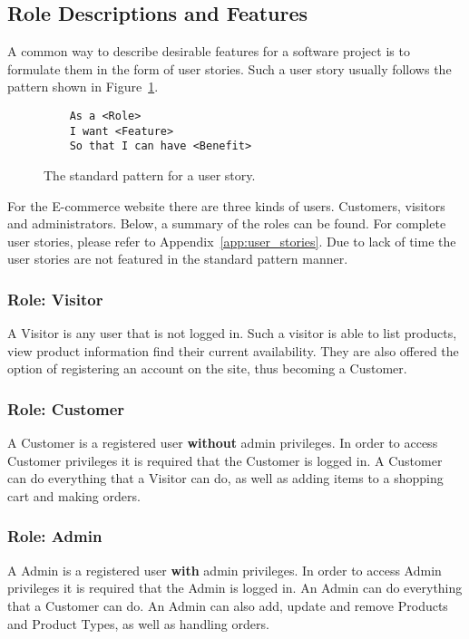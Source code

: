 \subsection{Role Descriptions and Features}

A common way to describe desirable features for a software project is to
formulate them in the form of user stories. Such a user story usually follows
the pattern shown in Figure~\ref{fig:user_story}.



\begin{figure}[H]
  \centering
  \begin{verbatim}
    As a <Role>
    I want <Feature>
    So that I can have <Benefit>
  \end{verbatim}
  \caption{\label{fig:user_story} The standard pattern for a user story.}
\end{figure}



For the E-commerce website there are three kinds of users. Customers, visitors and
administrators. Below, a summary of the roles can be found. For complete user
stories, please refer to Appendix~\ref{app:user_stories}. Due to lack of time the user stories are not featured in the standard pattern manner.

\subsubsection{Role: Visitor}\label{sec:visitor_role}

A Visitor is any user that is not logged in. Such a visitor is able to list
products, view product information find their current availability. They are
also offered the option of registering an account on the site, thus becoming
a Customer.

\subsubsection{Role: Customer}\label{sec:user_role}

A Customer is a registered user \textbf{without} admin privileges. In order to
access Customer privileges it is required that the Customer is logged in.
A Customer can do everything that a Visitor can do, as well as adding items
to a shopping cart and making orders.

\subsubsection{Role: Admin}\label{sec:admin_role}

A Admin is a registered user \textbf{with} admin privileges. In order to access
Admin privileges it is required that the Admin is logged in. An Admin can do
everything that a Customer can do. An Admin can also add, update and remove
Products and Product Types, as well as handling orders.
